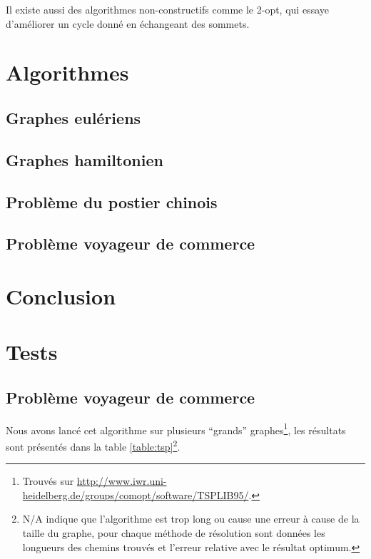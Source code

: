 \documentclass{scrartcl}
\begin{document}
    Il existe aussi des algorithmes non-constructifs comme le 2-opt, qui essaye
    d'améliorer un cycle donné en échangeant des sommets.


\section{Algorithmes}
  \subsection{Graphes eulériens}
  \subsection{Graphes hamiltonien}
  \subsection{Problème du postier chinois}
  \subsection{Problème voyageur de commerce}
  
\section{Conclusion}

\section{Tests}
\subsection{Problème voyageur de commerce}
    Nous avons lancé cet algorithme sur plusieurs ``grands''
    graphes\footnote{Trouvés sur
      \url{http://www.iwr.uni-heidelberg.de/groups/comopt/software/TSPLIB95/}.
    }, les résultats sont présentés dans la table \ref{table:tsp}\footnote{N/A
    indique que l'algorithme est trop long ou cause une erreur à cause de la
    taille du graphe, pour chaque méthode de résolution sont données les
    longueurs des chemins trouvés et l'erreur relative avec le résultat
    optimum.}.
\end{document}
